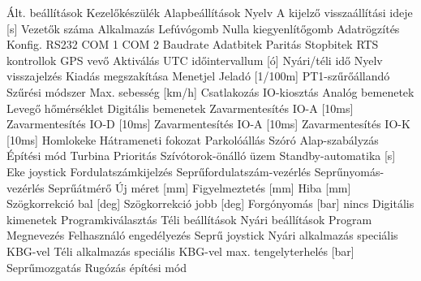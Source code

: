  {Ált. beállítások}
 {Kezelőkészülék}
 {Alapbeállítások}
 {Nyelv}
 {A kijelző visszaállítási ideje [s]}
 {Vezetők száma}
 {Alkalmazás}
 {Lefúvógomb}
 {Nulla kiegyenlítőgomb}
 {Adatrögzítés}
 {Konfig. RS232}
 {COM 1}
 {COM 2}
 {Baudrate}
 {Adatbitek}
 {Paritás}
 {Stopbitek}
 {RTS kontrollok}
 {GPS vevő}
 {Aktiválás}
 {UTC időintervallum [ó]}
 {Nyári/téli idő}
 {Nyelv visszajelzés}
 {Kiadás megszakítása}
 {Menetjel}
 {Jeladó [1/100m]}
 {PT1-szűrőállandó}
 {Szűrési módszer}
 {Max. sebesség [km/h]}
 {Csatlakozás}
 {IO-kiosztás}
 {Analóg bemenetek}
 {Levegő hőmérséklet}
 {Digitális bemenetek}
 {Zavarmentesítés IO-A [10ms]}
 {Zavarmentesítés IO-D [10ms]}
 {Zavarmentesítés IO-A [10ms]}
 {Zavarmentesítés IO-K [10ms]}
 {Homlokeke}
 {Hátrameneti fokozat}
 {Parkolóállás}
 {Szóró}
 {Alap-szabályzás}
 {Építési mód}
 {Turbina}
 {Prioritás}
 {Szívótorok-önálló üzem}
 {Standby-automatika [s]}
 {Eke joystick}
 {Fordulatszámkijelzés}
 {Seprűfordulatszám-vezérlés}
 {Seprűnyomás-vezérlés}
 {Seprűátmérő}
 {Új méret [mm]}
 {Figyelmeztetés [mm]}
 {Hiba [mm]}
 {Szögkorrekció bal [deg]}
 {Szögkorrekció jobb [deg]}
 {Forgónyomás [bar]}
 {nincs}
 {Digitális kimenetek}
 {Programkiválasztás}
 {Téli beállítások}
 {Nyári beállítások}
 {Program}
 {Megnevezés}
 {Felhasználó engedélyezés}
 {Seprű joystick}
 {Nyári alkalmazás speciális KBG-vel}
 {Téli alkalmazás speciális KBG-vel}
 {max. tengelyterhelés [bar]}
 {Seprűmozgatás}
 {Rugózás építési mód}
